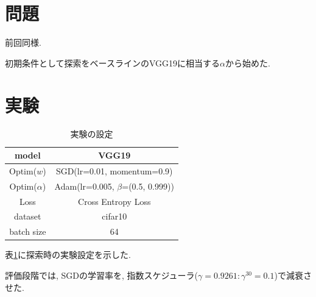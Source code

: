 \documentclass[twocolumn]{jarticle}     %
\begin{document}



\section{問題}
前回同様.

初期条件として探索をベースラインのVGG19に相当する$\alpha$から始めた.

\section{実験}

\begin{table}[tb]
  \begin{center}
    \caption{実験の設定}
    \begin{tabular}{|c|c|} \hline
      model & VGG19 \\ \hline
      Optim($w$) & SGD(lr=0.01, momentum=0.9) \\ \hline
      Optim($\alpha$) & Adam(lr=0.005, $\beta$=(0.5, 0.999)) \\ \hline
      Loss & Cross Entropy Loss \\ \hline
      dataset & cifar10 \\ \hline
      batch size & 64 \\ \hline
    \end{tabular}
    \label{tab:setting}
  \end{center}
\end{table}

表\ref{tab:setting}に探索時の実験設定を示した.

評価段階では, SGDの学習率を, 指数スケジューラ($\gamma = 0.9261 : \gamma^{30} = 0.1$)で減衰させた.
\end{document}
